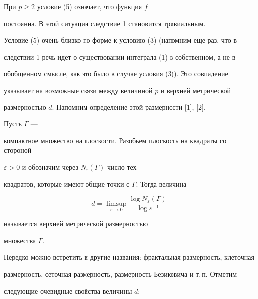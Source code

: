 \begin{note}


При $p\ge 2$ условие (5) означает, что функция $f$


постоянна. В этой ситуации следствие 1 становится тривиальным.


\end{note}





Условие (5) очень близко по форме к условию (3) (напомним еще раз, что в


следствии 1 речь идет о существовании интеграла (1) в собственном, а не в


обобщенном смысле, как это было в случае условия (3)). Это совпадение


указывает на возможные связи между величиной $p$ и верхней метрической


размерностью $d$. Напомним определение этой размерности [1], [2].





\begin{defn}


Пусть $\Gamma$ ---


компактное множество на плоскости. Разобьем плоскость на квадраты со стороной


$\varepsilon >0$ и обозначим через $N_{\varepsilon}(\Gamma)$ число тех


квадратов, которые имеют общие точки с $\Gamma$. Тогда величина


$$


d = \limsup_{\varepsilon\to 0}\frac{\log N_{\varepsilon}(\Gamma)}


{\log \varepsilon^{-1}}


$$


называется верхней метрической размерностью


множества $\Gamma$.


\end{defn}





Нередко можно встретить и другие названия: фрактальная размерность, клеточная


размерность, сеточная размерность, размерность Безиковича и т.\,п. Отметим


следующие очевидные свойства величины $d$:





